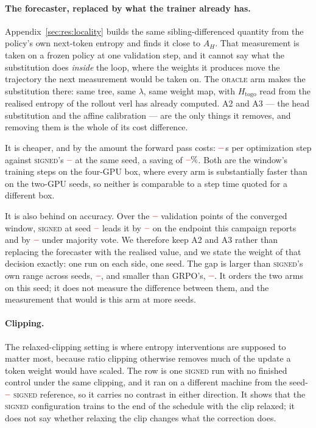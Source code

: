 \documentclass[11pt]{article}
\newcommand{\Htogo}{H_{\mathrm{togo}}}
\newcommand{\AH}{A_{H}}
\providecommand{\PENDING}{\textcolor{red}{\textbf{--}}}
\newcommand{\num}[1]{\ifcsname #1\endcsname\csname #1\endcsname\else\PENDING\fi}
\begin{document}
\paragraph{The forecaster, replaced by what the trainer already has.}
Appendix~\ref{sec:res:locality} builds the same sibling-differenced quantity from the
policy's own next-token entropy and finds it close to $\AH$. That measurement is
taken on a frozen policy at one validation step, and it cannot say what the
substitution does \emph{inside} the loop, where the weights it produces move the
trajectory the next measurement would be taken on. The \textsc{oracle} arm makes the
substitution there: same tree, same $\lambda$, same weight map, with $\Htogo$ read
from the realised entropy of the rollout verl has already computed. A2 and A3 ---
the head substitution and the affine calibration --- are the only things it removes,
and removing them is the whole of its cost difference.

It is cheaper, and by the amount the forward pass costs: $\num{Roraclecost}$\,s per
optimization step against \textsc{signed}'s $\num{Fsignedoracleref}$ at the same seed, a
saving of $\num{Fsignedoraclesaving}\%$. Both are the window's training steps on the
four-GPU box, where every arm is substantially faster than on the two-GPU seeds, so
neither is comparable to a step time quoted for a different box.

It is also behind on accuracy. Over the
$\num{Fnsignedoracle}$ validation points of the converged window, \textsc{signed} at seed
$\num{Roracleseed}$ leads it by $\num{Fsignedoracleacc}$ on the endpoint this
campaign reports and by $\num{Fsignedoraclemaj}$ under majority vote. We therefore
keep A2 and A3 rather than replacing the forecaster with the realised value, and we
state the weight of that decision exactly: one run on each side, one seed. The gap is
larger than \textsc{signed}'s own range across seeds, $\num{Ssignedacc}$, and smaller than
GRPO's, $\num{Sgrpoacc}$. It orders the two arms on this seed; it does not measure
the difference between them, and the measurement that would is this arm at more
seeds.

\paragraph{Clipping.} The relaxed-clipping setting is where entropy interventions
are supposed to matter most, because ratio clipping otherwise removes much of the
update a token weight would have scaled. The row is one \textsc{signed} run with no
finished control under the same clipping, and it ran on a different machine from the
seed-$\num{Rxclipsignedseed}$ \textsc{signed} reference, so it carries no contrast in either
direction. It shows that the \textsc{signed} configuration trains to the end of the schedule with
the clip relaxed; it does not say whether relaxing the clip changes what the correction does.
\end{document}
